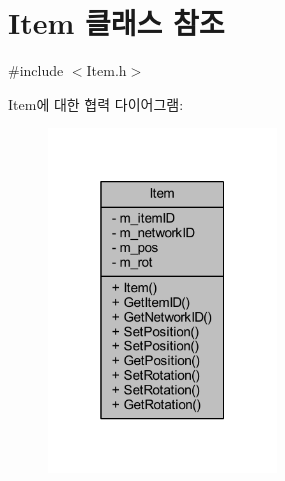 \hypertarget{class_item}{}\section{Item 클래스 참조}
\label{class_item}


{\ttfamily \#include $<$Item.\+h$>$}



Item에 대한 협력 다이어그램\+:\nopagebreak
\begin{figure}[H]
\begin{center}
\leavevmode
\includegraphics[width=172pt]{class_item__coll__graph}
\end{center}
\end{figure}
